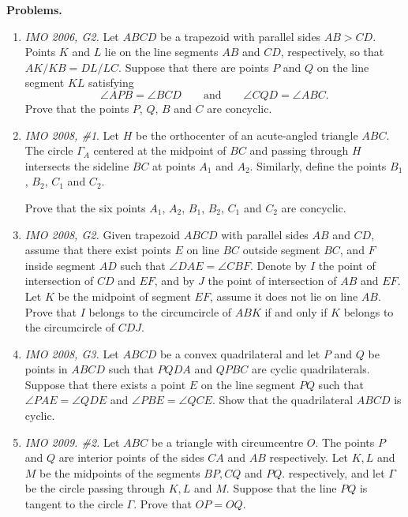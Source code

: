 \documentclass[11pt,a4paper]{article}
\begin{document}
\textbf{Problems.}
\begin{enumerate}
\item \emph {IMO 2006, G2.} Let $ ABCD$ be a trapezoid with parallel sides $ AB > CD$. Points $ K$ and $ L$ lie on the line segments $ AB$ and $ CD$, respectively, so that $AK/KB=DL/LC$. Suppose that there are points $ P$ and $ Q$ on the line segment $ KL$ satisfying \[\angle{APB} = \angle{BCD}\qquad\text{and}\qquad \angle{CQD} = \angle{ABC}.\] Prove that the points $ P$, $ Q$, $ B$ and $ C$ are concyclic.

\item \emph{IMO 2008, \#1}. Let $ H$ be the orthocenter of an acute-angled triangle $ ABC$. The circle $ \Gamma_{A}$ centered at the midpoint of $ BC$ and passing through $ H$ intersects the sideline $ BC$ at points $ A_{1}$ and $ A_{2}$. Similarly, define the points $ B_{1}$, $ B_{2}$, $ C_{1}$ and $ C_{2}$.

Prove that the six points $ A_{1}$, $ A_{2}$, $ B_{1}$, $ B_{2}$, $ C_{1}$ and $ C_{2}$ are concyclic.

\item \emph{IMO 2008, G2.} Given trapezoid $ ABCD$ with parallel sides $ AB$ and $ CD$, assume that there exist points $ E$ on line $ BC$ outside segment $ BC$, and $ F$ inside segment $ AD$ such that $ \angle DAE = \angle CBF$. Denote by $ I$ the point of intersection of $ CD$ and $ EF$, and by $ J$ the point of intersection of $ AB$ and $ EF$. Let $ K$ be the midpoint of segment $ EF$, assume it does not lie on line $ AB$. Prove that $ I$ belongs to the circumcircle of $ ABK$ if and only if $ K$ belongs to the circumcircle of $ CDJ$.

\item \emph{IMO 2008, G3.} Let $ ABCD$ be a convex quadrilateral and let $ P$ and $ Q$ be points in $ ABCD$ such that $ PQDA$ and $ QPBC$ are cyclic quadrilaterals. Suppose that there exists a point $ E$ on the line segment $ PQ$ such that $ \angle PAE = \angle QDE$ and $ \angle PBE = \angle QCE$. Show that the quadrilateral $ ABCD$ is cyclic.

\item\emph {IMO 2009. \#2.} Let $ ABC$ be a triangle with circumcentre $ O$. The points $ P$ and $ Q$ are interior points of the sides $ CA$ and $ AB$ respectively. Let $ K,L$ and $ M$ be the midpoints of the segments $ BP,CQ$ and $ PQ$. respectively, and let $ \Gamma$ be the circle passing through $ K,L$ and $ M$. Suppose that the line $ PQ$ is tangent to the circle $ \Gamma$. Prove that $ OP = OQ.$


\end{enumerate}
\end{document}
